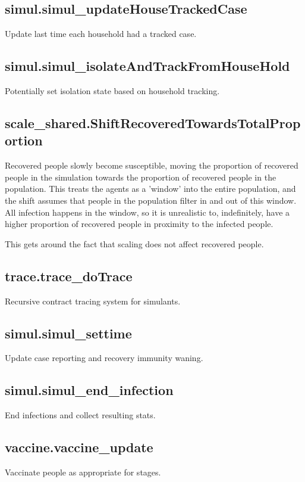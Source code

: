 \documentclass[]{article}
\begin{document}
\subsection{simul.simul\_updateHouseTrackedCase}
Update last time each household had a tracked case.

\subsection{simul.simul\_isolateAndTrackFromHouseHold}
Potentially set isolation state based on household tracking.

\subsection{scale\_shared.ShiftRecoveredTowardsTotalProportion}
Recovered people slowly become susceptible, moving the proportion of recovered people in the simulation towards the proportion of recovered people in the population. This treats the agents as a 'window' into the entire population, and the shift assumes that people in the population filter in and out of this window. All infection happens in the window, so it is unrealistic to, indefinitely, have a higher proportion of recovered people in proximity to the infected people.

This gets around the fact that scaling does not affect recovered people.

\subsection{trace.trace\_doTrace}
Recursive contract tracing system for simulants.

\subsection{simul.simul\_settime}
Update case reporting and recovery immunity waning.

\subsection{simul.simul\_end\_infection}
End infections and collect resulting stats.

\subsection{vaccine.vaccine\_update}
Vaccinate people as appropriate for stages.
\end{document}
